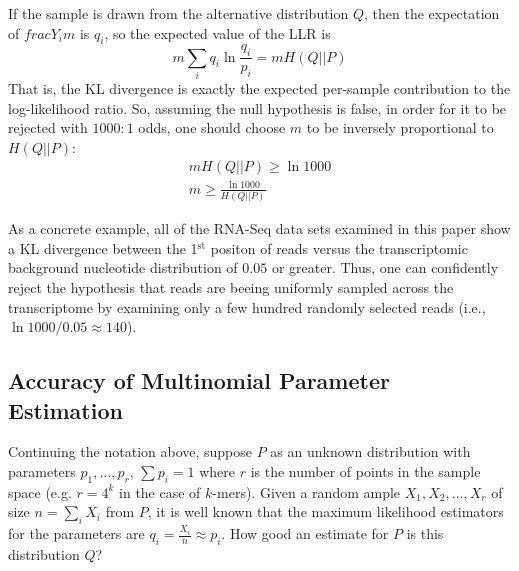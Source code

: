 \documentclass[letterpaper]{article}
\begin{document}
If the sample is drawn from the alternative distribution $Q$, then the
expectation of $frac{Y_{i}}{m}$ is $q_i$, so the expected value of the LLR is
$$ m \sum_{i} q_{i} \ln \frac{q_{i}}{p_{i}} = m H(Q || P) $$
That is, the KL divergence is exactly the expected per-sample contribution to
the log-likelihood ratio.
So, assuming the null hypothesis is false, in order for it to be rejected with
$1000:1$ odds, one should choose $m$ to be inversely proportional to $H(Q ||
P)$:
\begin{align*}
m H(Q||P) \ge \ln 1000 \\
m \ge \frac{\ln 1000}{H(Q || P)}
\end{align*}

As a concrete example, all of the RNA-Seq data sets examined in this paper show
a KL divergence between the 1$^{\text{st}}$ positon of reads versus the
transcriptomic background nucleotide distribution of $0.05$ or greater. Thus,
one can confidently reject the hypothesis that reads are beeing uniformly
sampled across the transcriptome by examining only a few hundred randomly
selected reads (i.e., $\ln 1000 / 0.05 \approx 140$).


\subsection{Accuracy of Multinomial Parameter Estimation}

Continuing the notation above, suppose $P$ as an unknown distribution with
parameters $p_1, \dots, p_r$, $\sum p_i = 1$ where $r$ is the number of points
in the sample space (e.g. $r = 4^{k}$ in the case of $k$-mers). Given a random
ample $X_1, X_2, \dots, X_r$ of size $n = \sum_{i} X_i$ from $P$, it is well
known that the maximum likelihood estimators for the parameters are $q_i =
\frac{X_i}{n} \approx p_i$. How good an estimate for $P$ is this distribution
$Q$?
\end{document}
